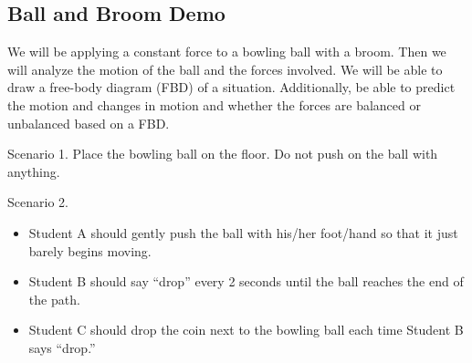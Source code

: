 \documentclass[]{exam}
\begin{document}
\subsection*{Ball and Broom Demo}

We will be applying a constant force to a bowling ball with a broom. Then we will analyze the motion of the ball and the forces involved. We will be able to draw a free-body diagram (FBD) of a situation. Additionally, be able to predict the motion and changes in motion and whether the forces are balanced or unbalanced based on a FBD.

\begin{questions}

\question
Scenario 1. Place the bowling ball on the floor. Do not push on the ball with anything.


\question
Scenario 2.

\begin{itemize}[itemsep=0pt,topsep=0pt]
    \item Student A should gently push the ball with his/her foot/hand so that it just barely begins moving.
    \item Student B should say ``drop'' every 2 seconds until the ball reaches the end of the path.
    \item Student C should drop the coin next to the bowling ball each time Student B says ``drop.''
\end{itemize}

\medskip

\begin{parts}

\end{parts}
\end{questions}
\end{document}
